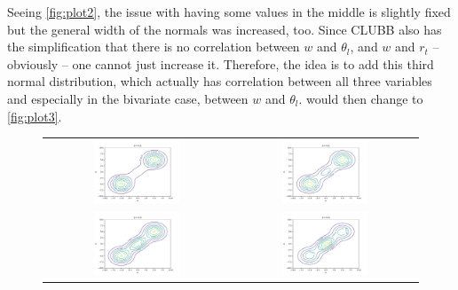 Seeing \cref{fig:plot2},
the issue with having some values in the middle is slightly fixed
but the general width of the normals was increased, too.
Since \gls{CLUBB} also has the simplification
that there is no correlation between $w$ and $\theta_l$,
and $w$ and $r_t$ -- obviously -- one cannot just increase it.
Therefore, the idea is to add this third normal distribution,
which actually has correlation between all three variables
and especially in the bivariate case, between $w$ and $\theta_l$.
 would then change to \cref{fig:plot3}.
\begin{figure}[!htb]
    \centering
    \begin{tabular}{cc}
        \multicolumn{1}{c}{\includegraphics[width=0.48\textwidth]{include/figures/plot3_1}} &
        \multicolumn{1}{c}{\includegraphics[width=0.48\textwidth]{include/figures/plot3_2}} \\
        \multicolumn{1}{c}{\includegraphics[width=0.48\textwidth]{include/figures/plot3_3}} &
        \multicolumn{1}{c}{\includegraphics[width=0.48\textwidth]{include/figures/plot3_4}} \\

\end{tabular}
\end{figure}

